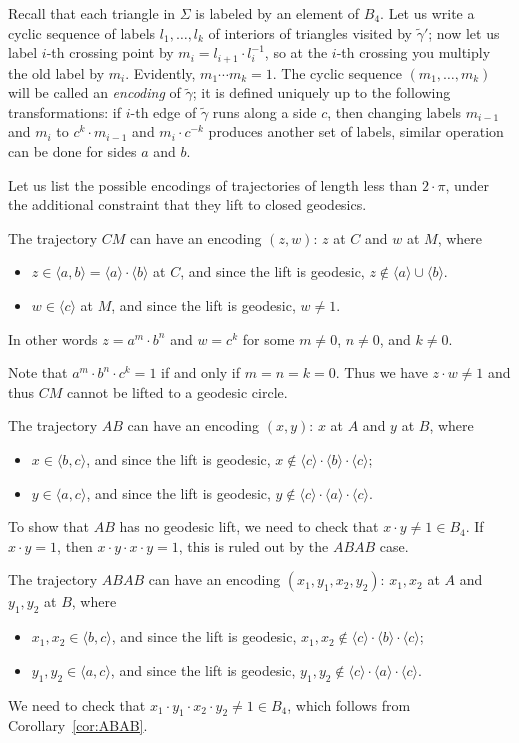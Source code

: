 \documentclass[a4paper,10pt]{article}
\begin{document}
Recall that each triangle in $\Sigma$ is labeled by an element of $B_4$.
Let us write a cyclic sequence of labels $l_1,\dots,l_k$ of interiors of triangles visited by $\tilde \gamma'$;
now let us label $i$-th crossing point by $m_i=l_{i+1}\cdot l_i^{-1}$, so at the $i$-th crossing you multiply the old label by $m_i$.
Evidently, $m_1\cdots m_k=1$.
The cyclic sequence $(m_1,\dots,m_k)$ will be called an \emph{encoding} of $\tilde\gamma$;
it is defined uniquely up to the following transformations: if $i$-th edge of $\tilde\gamma$ runs along a side $c$, then changing labels $m_{i-1}$ and $m_i$ to $c^k\cdot m_{i-1}$ and $m_i\cdot c^{-k}$ produces another set of labels, similar operation can be done for sides $a$ and $b$.

Let us list the possible encodings of trajectories of length less than $2\cdot\pi$, under the additional constraint that they lift to closed geodesics.

 The trajectory $CM$ can have an encoding $(z,w)$: $z$ at $C$ and $w$ at $M$, where
\begin{itemize}
\item $z\in \langle a,b\rangle=\langle a\rangle\cdot\langle b\rangle$ at $C$, and since the lift is geodesic, $z\notin\langle a\rangle\cup \langle b\rangle$.
\item $w\in \langle c\rangle$ at $M$, and since the lift is geodesic, $w\ne 1$.
\end{itemize}
In other words $z=a^m\cdot b^n$ and $w=c^k$ for some $m\ne 0$, $n\ne 0$, and $k\ne 0$.

Note that $a^m\cdot b^n\cdot c^k=1$ if and only if $m=n=k=0$.
Thus we have $z\cdot w\ne 1$ and thus $CM$ cannot be lifted to a geodesic circle.

 The trajectory $AB$ can have an encoding $(x,y)$: $x$ at $A$ and $y$ at $B$, where
\begin{itemize}
\item $x\in \langle b,c\rangle$, and since the lift is geodesic, $x\notin \langle c\rangle\cdot\langle b\rangle\cdot\langle c\rangle$;
\item $y\in \langle a,c\rangle$, and since the lift is geodesic, $y\notin \langle c\rangle\cdot\langle a\rangle\cdot\langle c\rangle$.
\end{itemize}
To show that $AB$ has no geodesic lift, we need to check that $x\cdot y\ne1\in B_4$.
If $x\cdot y=1$, then $x\cdot y\cdot x\cdot y=1$, this is ruled out by the $ABAB$ case.

The trajectory $ABAB$ can have an encoding $(x_1,y_1,x_2,y_2)$: $x_1,x_2$ at $A$ and $y_1,y_2$ at $B$, where
\begin{itemize}
\item $x_1,x_2\in \langle b,c\rangle$, and since the lift is geodesic, $x_1,x_2\notin \langle c\rangle\cdot\langle b\rangle\cdot\langle c\rangle$;
\item $y_1,y_2\in \langle a,c\rangle$, and since the lift is geodesic, $y_1,y_2\notin \langle c\rangle\cdot\langle a\rangle\cdot\langle c\rangle$.
\end{itemize}
We need to check that $x_1\cdot y_1\cdot x_2\cdot y_2\ne1\in B_4$, which follows from
Corollary~\ref{cor:ABAB}.
\end{document}

